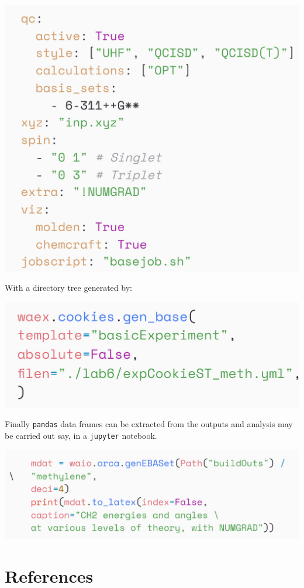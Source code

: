 \documentclass[a0paper,fleqn]{betterposter}
\begin{document}
{\includegraphics[width=\textwidth]{img/exampleRun.png}

With a directory tree generated by:

\includegraphics[width=\textwidth]{img/genDirTree.png}

Finally \texttt{pandas} data frames can be extracted from the outputs and analysis may be carried out say, in a \texttt{jupyter} notebook.

\includegraphics[width=\textwidth]{img/genEBA.png}

\section{References}
\nocite{ahoCompilersPrinciplesTechniques2007,sandveTenSimpleRules2013,pengReproducibleResearchComputational2011,oboyleCclibLibraryPackageindependent2008a,neeseORCAQuantumChemistry2020,kolosImprovedTheoreticalGround1968}
\printbibliography[heading=none] %
}
\end{document}
